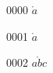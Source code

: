 \documentclass{article}
\begin{document}
0000 $\mathring{a}$\par
0001 $\displaystyle\mathring{a}$\par
0002 $\mathring{abc}$\par
\end{document}
